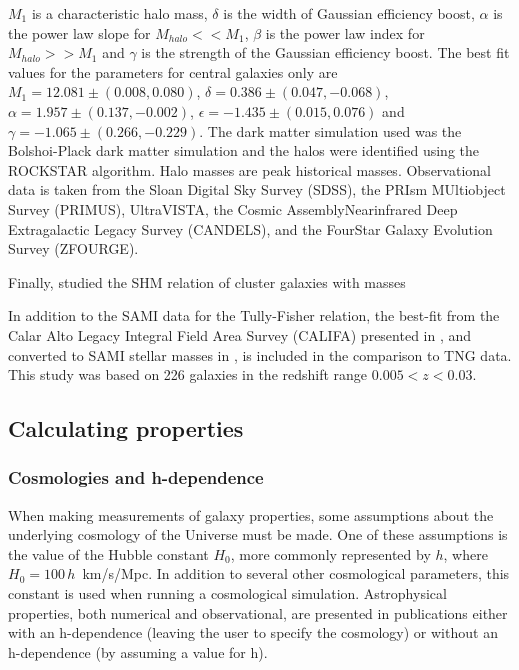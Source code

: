 $M_1$ is a characteristic halo mass, $\delta$ is the width of Gaussian efficiency boost, $\alpha$ is the power law slope for $M_{halo} << M_1$, $\beta$ is the power law index for $M_{halo} >> M_1$ and $\gamma$ is the strength of the Gaussian efficiency boost. The best fit values for the parameters for central galaxies only are $M_1 = 12.081\pm(0.008, 0.080)$, $\delta = 0.386 \pm (0.047, -0.068)$, $\alpha = 1.957 \pm (0.137, -0.002)$, $\epsilon = -1.435 \pm (0.015, 0.076)$ and $\gamma = -1.065 \pm (0.266, -0.229)$. The dark matter simulation used was the Bolshoi-Plack dark matter simulation and the halos were identified using the ROCKSTAR algorithm. Halo masses are peak historical masses. Observational data is taken from the Sloan Digital Sky Survey (SDSS), the PRIsm MUltiobject Survey (PRIMUS), UltraVISTA, the Cosmic AssemblyNearinfrared Deep Extragalactic Legacy Survey (CANDELS), and the FourStar Galaxy Evolution Survey (ZFOURGE).

Finally, \textcite{Kravtsov2018} studied the SHM relation of cluster galaxies with masses 

In addition to the SAMI data for the Tully-Fisher relation, the best-fit from the Calar Alto Legacy Integral Field Area Survey (CALIFA) presented in \textcite{Bekerait2016}, and converted to SAMI stellar masses in \textcite{Bloom2017}, is included in the comparison to TNG data. This study was based on 226 galaxies in the redshift range $0.005 < z < 0.03$.


\subsection{Calculating properties}

\subsubsection{Cosmologies and h-dependence} \label{cosmologies}
When making measurements of galaxy properties, some assumptions about the underlying cosmology of the Universe must be made. One of these assumptions is the value of the Hubble constant $H_0$, more commonly represented by $h$, where $H_0 = 100\,h\,$ km/s/Mpc. In addition to several other cosmological parameters, this constant is used when running a cosmological simulation. Astrophysical properties, both numerical and observational, are presented in publications either with an h-dependence (leaving the user to specify the cosmology) or without an h-dependence (by assuming a value for h).

